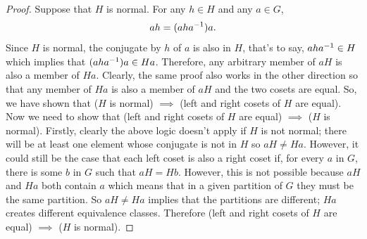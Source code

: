 \documentclass[MathsNotesBase.tex]{subfiles}
\begin{document}
{		
		\begin{proof}
			Suppose that $H$ is normal. For any $h \in H$ and any $a \in G$,
			\[ ah = (ah{a}^{-1})a. \]
			Since $H$ is normal, the conjugate by $h$ of $a$ is also in $H$, that's to say, $ ah{a}^{-1} \in H $ which implies that $ (ah{a}^{-1})a \in Ha $. Therefore, any arbitrary member of $aH$ is also a member of $Ha$. Clearly, the same proof also works in the other direction so that any member of $Ha$ is also a member of $aH$ and the two cosets are equal. So, we have shown that ($H$ is normal) $\implies$ (left and right cosets of $H$ are equal). \\
			Now we need to show that (left and right cosets of $H$ are equal) $\implies$ ($H$ is normal). Firstly, clearly the above logic doesn't apply if $H$ is not normal; there will be at least one element whose conjugate is not in $H$ so $aH \neq Ha$. However, it could still be the case that each left coset is also a right coset if, for every $a$ in $G$, there is some $b$ in $G$ such that $aH = Hb$. However, this is not possible because $aH$ and $Ha$ both contain $a$ which means that in a given partition of $G$ they must be the same partition. So $aH \neq Ha$ implies that the partitions are different; $Ha$ creates different equivalence classes. Therefore  (left and right cosets of $H$ are equal) $\implies$ ($H$ is normal).
		\end{proof} 
	}
	
	
	
	\pagebreak
		
\end{document}
